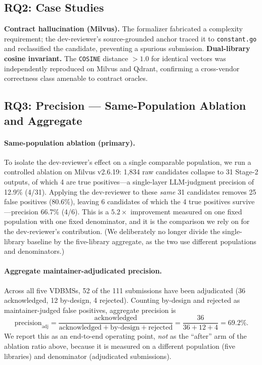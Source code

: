 \documentclass[sigconf]{acmart}
\begin{document}
\subsection{RQ2: Case Studies}
\textbf{Contract hallucination (Milvus).} The formalizer fabricated a complexity requirement; the dev-reviewer's source-grounded anchor traced it to \texttt{constant.go} and reclassified the candidate, preventing a spurious submission.
\textbf{Dual-library cosine invariant.} The \texttt{COSINE} distance $>1.0$ for identical vectors was independently reproduced on Milvus and Qdrant, confirming a cross-vendor correctness class amenable to contract oracles.

\subsection{RQ3: Precision --- Same-Population Ablation and Aggregate}\label{sec:eval-rq3}

\paragraph{Same-population ablation (primary).} To isolate the dev-reviewer's effect on a single comparable population, we run a controlled ablation on Milvus v2.6.19: 1{,}834 raw candidates collapse to 31 Stage-2 outputs, of which 4 are true positives---a single-layer LLM-judgment precision of 12.9\% (4/31). Applying the dev-reviewer to these \emph{same} 31 candidates removes 25 false positives (80.6\%), leaving 6 candidates of which the 4 true positives survive---precision 66.7\% (4/6). This is a $5.2\times$ improvement measured on one fixed population with one fixed denominator, and it is the comparison we rely on for the dev-reviewer's contribution. (We deliberately no longer divide the single-library baseline by the five-library aggregate, as the two use different populations and denominators.)

\paragraph{Aggregate maintainer-adjudicated precision.} Across all five VDBMSs, 52 of the 111 submissions have been adjudicated (36 acknowledged, 12 by-design, 4 rejected). Counting by-design and rejected as maintainer-judged false positives, aggregate precision is
\[
\mathrm{precision}_{\mathrm{adj}} = \frac{\mathrm{acknowledged}}{\mathrm{acknowledged}+\mathrm{by\text{-}design}+\mathrm{rejected}} = \frac{36}{36+12+4} = 69.2\%.
\]
We report this as an end-to-end operating point, \emph{not} as the ``after'' arm of the ablation ratio above, because it is measured on a different population (five libraries) and denominator (adjudicated submissions).
\end{document}
